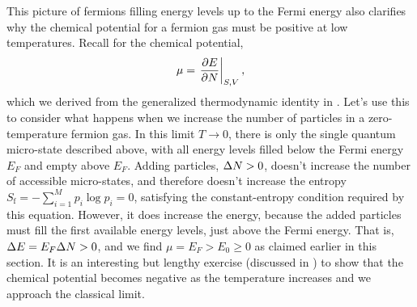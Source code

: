 This picture of fermions filling energy levels up to the Fermi energy also clarifies why the chemical potential for a fermion gas must be positive at low temperatures.
Recall  for the chemical potential,
\begin{equation*}
  \mu = \left.\frac{\partial E}{\partial N}\right|_{S, V},
\end{equation*}
which we derived from the generalized thermodynamic identity in .
Let's use this to consider what happens when we increase the number of particles in a zero-temperature fermion gas.
In this limit $T \to 0$, there is only the single quantum micro-state described above, with all energy levels filled below the Fermi energy $E_F$ and empty above $E_F$. %
Adding particles, $\Delta N > 0$, doesn't increase the number of accessible micro-states, and therefore doesn't increase the entropy $S_{\text{f}} = -\sum_{i = 1}^M p_i \log p_i = 0$, satisfying the constant-entropy condition required by this equation.
However, it does increase the energy, because the added particles must fill the first available energy levels, just above the Fermi energy.
That is, $\Delta E = E_F \Delta N > 0$, and we find $\mu = E_F > E_0 \geq 0$ as claimed earlier in this section.
It is an interesting but lengthy exercise (discussed in ) to show that the chemical potential becomes negative as the temperature increases and we approach the classical limit.

